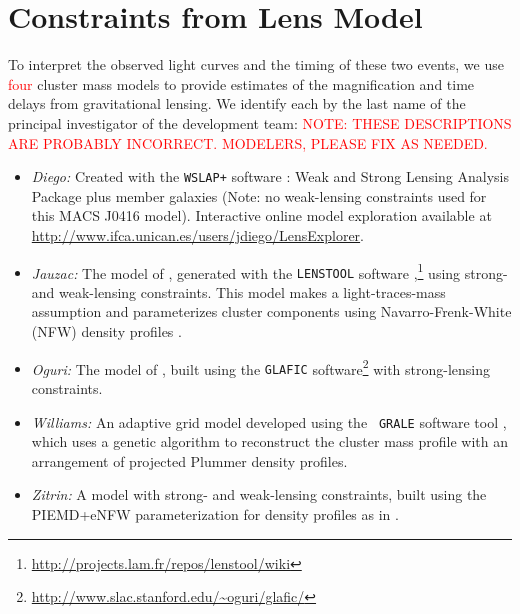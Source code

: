 \section{Constraints from Lens Model}\label{sec:LensingModels}

To interpret the observed light curves and the timing of these two
events, we use \textcolor{red}{four} cluster mass models to provide
estimates of the magnification and time delays from gravitational
lensing.  We identify each by the last name of the principal
investigator of the development team:
\textcolor{red}{NOTE: THESE DESCRIPTIONS ARE PROBABLY INCORRECT.  MODELERS, PLEASE FIX AS NEEDED.}


\bigskip
\begin{itemize}
\item{\it Diego:} Created with the {\tt WSLAP+} software
  \citep{Sendra:2014}: Weak and Strong Lensing Analysis Package plus
  member galaxies (Note: no weak-lensing constraints used for this
  MACS J0416 model). Interactive online model exploration available at
  \url{http://www.ifca.unican.es/users/jdiego/LensExplorer}.
\item{{\it Jauzac:} The model of \citet{Jauzac:2014}, generated with the {\tt LENSTOOL} software
  \citep{Jullo:2007},\footnote{\url{http://projects.lam.fr/repos/lenstool/wiki}}}
  using strong- and weak-lensing constraints.  This model makes a
  light-traces-mass assumption and parameterizes cluster components
  using Navarro-Frenk-White (NFW) density profiles
  \citep{Navarro:1997}.
\item{\it Oguri:} The model of \citet{Kawamata:2015}, built using the {\tt GLAFIC} software\footnote{\url{http://www.slac.stanford.edu/~oguri/glafic/}} with strong-lensing constraints.
\item{{\it Williams:} An adaptive grid model developed using the {\tt
    GRALE} software tool
  \citep{Liesenborgs:2006,Liesenborgs:2007,Mohammed:2014}, which uses
  a genetic algorithm to reconstruct the cluster mass profile with an
  arrangement of projected Plummer \citeyear{Plummer:1911} density
  profiles.}
\item{{\it Zitrin:} A model with strong- and weak-lensing constraints, built using the PIEMD+eNFW parameterization for density profiles as in \citet{Zitrin:2009a}.}
\end{itemize}
\bigskip    


